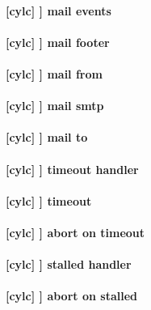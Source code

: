 \paragraph[mail events]{[cylc] \textrightarrow [[events]] \textrightarrow mail events}

\paragraph[mail footer]{[cylc] \textrightarrow [[events]] \textrightarrow mail footer}

\paragraph[mail from]{[cylc] \textrightarrow [[events]] \textrightarrow mail from}

\paragraph[mail smtp]{[cylc] \textrightarrow [[events]] \textrightarrow mail smtp}

\paragraph[mail to]{[cylc] \textrightarrow [[events]] \textrightarrow mail to}

\paragraph[timeout handler]{[cylc] \textrightarrow [[events]] \textrightarrow timeout handler}

\paragraph[timeout]{[cylc] \textrightarrow [[events]] \textrightarrow timeout}

\paragraph[abort on timeout]{[cylc] \textrightarrow [[events]] \textrightarrow abort on timeout}

\paragraph[stalled handler]{[cylc] \textrightarrow [[events]] \textrightarrow stalled handler}

\paragraph[abort on stalled]{[cylc] \textrightarrow [[events]] \textrightarrow abort on stalled}

